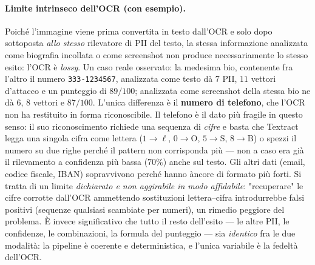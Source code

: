 \documentclass[11pt,a4paper]{article}
\begin{document}
\paragraph{Limite intrinseco dell'OCR (con esempio).} Poiché l'immagine viene prima
convertita in testo dall'OCR e solo dopo sottoposta \emph{allo stesso} rilevatore di PII
del testo, la stessa informazione analizzata come biografia incollata o come screenshot
non produce necessariamente lo stesso esito: l'OCR è \emph{lossy}. Un caso reale osservato:
la medesima bio, contenente fra l'altro il numero \texttt{333-1234567}, analizzata come
testo dà $7$ PII, $11$ vettori d'attacco e un punteggio di $89/100$; analizzata come
screenshot della stessa bio ne dà $6$, $8$ vettori e $87/100$. L'unica differenza è il
\textbf{numero di telefono}, che l'OCR non ha restituito in forma riconoscibile. Il
telefono è il dato più fragile in questo senso: il suo riconoscimento richiede una sequenza
di \emph{cifre} e basta che Textract legga una singola cifra come lettera
($1\!\to\!\ell$, $0\!\to\!\mathrm{O}$, $5\!\to\!\mathrm{S}$, $8\!\to\!\mathrm{B}$) o spezzi
il numero su due righe perché il pattern non corrisponda più --- non a caso era già il
rilevamento a confidenza più bassa ($70\%$) anche sul testo. Gli altri dati (email, codice
fiscale, IBAN) sopravvivono perché hanno àncore di formato più forti. Si tratta di un
limite \emph{dichiarato e non aggirabile in modo affidabile}: "recuperare" le cifre
corrotte dall'OCR ammettendo sostituzioni lettera--cifra introdurrebbe falsi positivi
(sequenze qualsiasi scambiate per numeri), un rimedio peggiore del problema. È invece
significativo che tutto il resto dell'esito --- le altre PII, le confidenze, le
combinazioni, la formula del punteggio --- sia \emph{identico} fra le due modalità: la
pipeline è coerente e deterministica, e l'unica variabile è la fedeltà dell'OCR.
\end{document}
